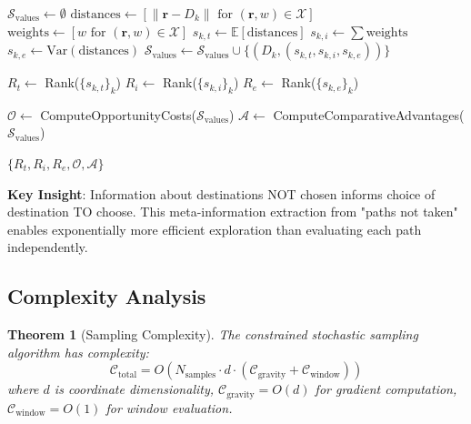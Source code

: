 \documentclass[12pt,a4paper]{article}
\newtheorem{theorem}{Theorem}
\begin{document}
\begin{algorithm}[H]
\caption{Comparative S-Value Meta-Information Extraction}
\begin{algorithmic}[1]
\State $\mathcal{S}_{\text{values}} \leftarrow \emptyset$
 
    \State $\text{distances} \leftarrow [\|\mathbf{r} - D_k\| \text{ for } (\mathbf{r}, w) \in \mathcal{X}]$
    \State $\text{weights} \leftarrow [w \text{ for } (\mathbf{r}, w) \in \mathcal{X}]$
    \State $s_{k,t} \leftarrow \mathbb{E}[\text{distances}]$ 
    \State $s_{k,i} \leftarrow \sum \text{weights}$ 
    \State $s_{k,e} \leftarrow \text{Var}(\text{distances})$ 
    \State $\mathcal{S}_{\text{values}} \leftarrow \mathcal{S}_{\text{values}} \cup \{(D_k, (s_{k,t}, s_{k,i}, s_{k,e}))\}$
\EndFor

\State $R_t \leftarrow$ Rank($\{s_{k,t}\}_k$) 
\State $R_i \leftarrow$ Rank($\{s_{k,i}\}_k$)
\State $R_e \leftarrow$ Rank($\{s_{k,e}\}_k$)

\State $\mathcal{O} \leftarrow$ ComputeOpportunityCosts($\mathcal{S}_{\text{values}}$)
\State $\mathcal{A} \leftarrow$ ComputeComparativeAdvantages($\mathcal{S}_{\text{values}}$)

\State \Return $\{R_t, R_i, R_e, \mathcal{O}, \mathcal{A}\}$ 
\EndProcedure
\end{algorithmic}
\end{algorithm}

\textbf{Key Insight}: Information about destinations NOT chosen informs choice of destination TO choose. This meta-information extraction from "paths not taken" enables exponentially more efficient exploration than evaluating each path independently.

\subsection{Complexity Analysis}

\begin{theorem}[Sampling Complexity]
The constrained stochastic sampling algorithm has complexity:
\begin{equation}
\mathcal{C}_{\text{total}} = O(N_{\text{samples}} \cdot d \cdot (\mathcal{C}_{\text{gravity}} + \mathcal{C}_{\text{window}}))
\end{equation}
where $d$ is coordinate dimensionality, $\mathcal{C}_{\text{gravity}} = O(d)$ for gradient computation, $\mathcal{C}_{\text{window}} = O(1)$ for window evaluation.
\end{theorem}
\end{document}
